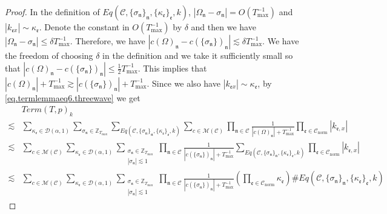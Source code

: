 \begin{proof}
In the definition of $Eq(\mathcal{C}, \{\sigma_{\mathfrak{n}}\}_{\mathfrak{n}}, \{\kappa_{\mathfrak{e}}\}_{\mathfrak{e}},k)$,
$|\Omega_{\mathfrak{n}}-\sigma_{\mathfrak{n}}|=O(T^{-1}_{\text{max}})$ and $|k_{\mathfrak{e}x}| \sim \kappa_{\mathfrak{e}}$. Denote the constant in $O(T^{-1}_{\text{max}})$ by $\delta$ and then we have $|\Omega_{\mathfrak{n}}-\sigma_{\mathfrak{n}}|\le \delta T^{-1}_{\text{max}}$. Therefore, we have $|c(\Omega)_{\mathfrak{n}}-c(\{\sigma_{\mathfrak{n}}\})_{\mathfrak{n}}|\lesssim \delta T^{-1}_{\text{max}}$. We have the freedom of choosing $\delta$ in the definition and we take it sufficiently small so that $|c(\Omega)_{\mathfrak{n}}-c(\{\sigma_{\mathfrak{n}}\})_{\mathfrak{n}}|\le \frac{1}{2}T^{-1}_{\text{max}}$. This implies that $|c(\Omega)_{\mathfrak{n}}|+T^{-1}_{\text{max}}\gtrsim |c(\{\sigma_{\mathfrak{n}}\})_{\mathfrak{n}}|+T^{-1}_{\text{max}}$. Since we also have $|k_{\mathfrak{e}x}| \sim \kappa_{\mathfrak{e}}$, by \eqref{eq.termlemmaeq6.threewave} we get
\begin{equation}\label{eq.lemboundtermTp.threewave}
\begin{split}
    &Term(T, p)_k
    \\
    \lesssim& \sum_{\kappa_{\mathfrak{e}}\in \mathcal{D}(\alpha,1)}\sum_{\sigma_{\mathfrak{n}}\in \mathbb{Z}_{T_{\text{max}}}}\sum_{Eq(\mathcal{C}, \{\sigma_{\mathfrak{n}}\}_{\mathfrak{n}}, \{\kappa_{\mathfrak{e}}\}_{\mathfrak{e}},k)} \sum_{c\in \mathscr{M}(\mathcal{C}) }\prod_{\mathfrak{n}\in \mathcal{C}}\frac{1}{|c(\Omega)_{\mathfrak{n}}|+T^{-1}_{\text{max}}} \prod_{\mathfrak{e}\in \mathcal{C}_{\text{norm}}}|k_{\mathfrak{e},x}|
    \\
    \lesssim &\sum_{c\in \mathscr{M}(\mathcal{C}) }\sum_{\kappa_{\mathfrak{e}}\in \mathcal{D}(\alpha,1)}\sum_{\substack{\sigma_{\mathfrak{n}}\in \mathbb{Z}_{T_{\text{max}}}\\ |\sigma_{\mathfrak{n}}|\lesssim 1}}\prod_{\mathfrak{n}\in \mathcal{C}}\frac{1}{|c(\{\sigma_{\mathfrak{n}}\})_{\mathfrak{n}}|+T^{-1}_{\text{max}}} \sum_{Eq(\mathcal{C}, \{\sigma_{\mathfrak{n}}\}_{\mathfrak{n}}, \{\kappa_{\mathfrak{e}}\}_{\mathfrak{e}},k)} \prod_{\mathfrak{e}\in \mathcal{C}_{\text{norm}}}|k_{\mathfrak{e},x}|
    \\
    \lesssim &\sum_{c\in \mathscr{M}(\mathcal{C}) }\sum_{\kappa_{\mathfrak{e}}\in \mathcal{D}(\alpha,1)}\sum_{\substack{\sigma_{\mathfrak{n}}\in \mathbb{Z}_{T_{\text{max}}}\\ |\sigma_{\mathfrak{n}}|\lesssim 1}}\prod_{\mathfrak{n}\in \mathcal{C}}\frac{1}{|c(\{\sigma_{\mathfrak{n}}\})_{\mathfrak{n}}|+T^{-1}_{\text{max}}} \left(\prod_{\mathfrak{e}\in \mathcal{C}_{\text{norm}}}\kappa_{\mathfrak{e}}\right)\#Eq(\mathcal{C}, \{\sigma_{\mathfrak{n}}\}_{\mathfrak{n}}, \{\kappa_{\mathfrak{e}}\}_{\mathfrak{e}},k) 

\end{split}
\end{equation}
\end{proof}
